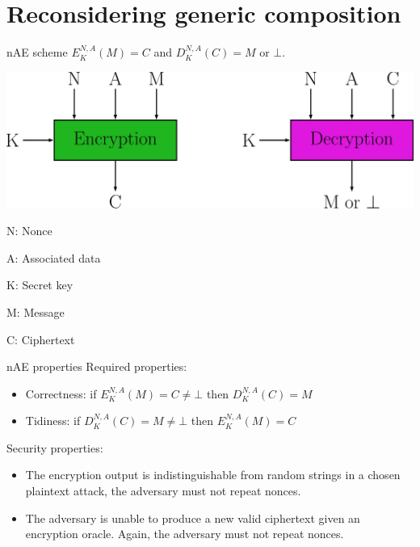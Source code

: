 \documentclass[11pt]{beamer}
\begin{document}
\section{Reconsidering generic composition}
\begin{frame}{nAE scheme}
$E^{N,A}_K(M) = C$ and $D^{N,A}_K(C) = M$ or $\bot$.

\begin{center}
\includegraphics[scale=0.12]{nae.jpg}
\end{center}

N: Nonce

A: Associated data

K: Secret key

M: Message

C: Ciphertext
\end{frame}

\begin{frame}{nAE properties}
Required properties:
\begin{itemize}
\item Correctness: if $E^{N,A}_K(M) = C \not= \bot$ then $D^{N,A}_K(C)=M$
\item Tidiness: if $D^{N,A}_K(C) = M \not= \bot$ then $E^{N,A}_K(M)=C$
\end{itemize}
Security properties:
\begin{itemize}
\item The encryption output is indistinguishable from random strings in a chosen plaintext attack, the adversary must not repeat nonces.
\item The adversary is unable to produce a new valid ciphertext given an encryption oracle. Again, the adversary must not repeat nonces.
\end{itemize}
\end{frame}
\end{document}

